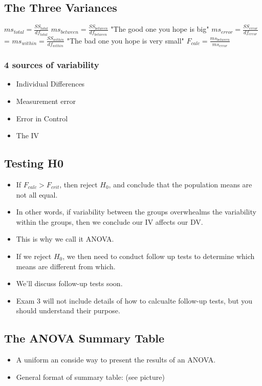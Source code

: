\documentclass[11pt]{report}
\begin{document}
\subsection{The Three Variances}
$ms_{total} = \frac{SS_{total}}{df_{total}}$ \newline
$ms_{between} = \frac{SS_{between}}{df_{between}}$ "The good one you hope is big" \newline
$ms_{error} = \frac{SS_{error}}{df_{error}}$ = $ms_{within} = \frac{SS_{within}}{df_{within}}$ "The bad one you hope is very small" \newline
$F_{calc} = \frac{ms_{between}}{ms_{error}}$ \newline

\subsubsection{4 sources of variability}
\begin{itemize}
    \item Individual Differences
    \item Measurement error 
    \item Error in Control
    \item The IV 
\end{itemize} 

\subsection{Testing H0}
\begin{itemize}
    \item If $F_{calc} > F_{crit}$, then reject $H_0$, and conclude that the population means are not all equal.
    \item In other words, if variability between the groups overwhealms the variability within the groups, then we conclude our IV affects our DV. 
    \item This is why we call it ANOVA.
    \item If we reject $H_0$, we then need to conduct follow up tests to determine which means are different from which. 
    \item We'll discuss follow-up tests soon.
    \item Exam 3 will not include details of how to calcualte follow-up tests, but you should understand their purpose. 
\end{itemize}

\subsection{The ANOVA Summary Table}
\begin{itemize}
    \item A uniform an conside way to present the results of an ANOVA.
    \item General format of summary table: (see picture)
\end{itemize}
\end{document}
